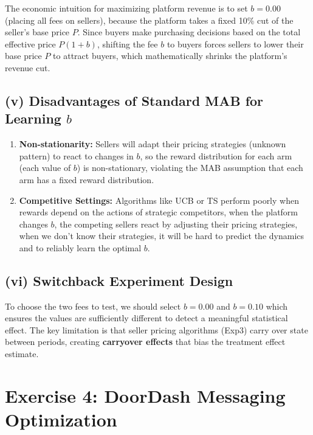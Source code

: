 \documentclass[12pt]{article}
\begin{document}
The economic intuition for maximizing platform revenue is to set $b=0.00$ (placing all fees on sellers), because the platform takes a fixed 10\% cut of the seller's base price $P$. Since buyers make purchasing decisions based on the total effective price $P(1+b)$, shifting the fee $b$ to buyers forces sellers to lower their base price $P$ to attract buyers, which mathematically shrinks the platform's revenue cut.

\subsection*{(v) Disadvantages of Standard MAB for Learning $b$}

\begin{enumerate}
    \item \textbf{Non-stationarity:} Sellers will adapt their pricing strategies (unknown pattern) to react to changes in $b$, so the reward distribution for each arm (each value of $b$) is non-stationary, violating the MAB assumption that each arm has a fixed reward distribution.
    \item \textbf{Competitive Settings:} Algorithms like UCB or TS perform poorly when rewards depend on the actions of strategic competitors, when the platform changes $b$, the competing sellers react by adjusting their pricing strategies, when we don't know their strategies, it will be hard to predict the dynamics and to reliably learn the optimal $b$.
\end{enumerate}

\subsection*{(vi) Switchback Experiment Design}

To choose the two fees to test, we should select $b=0.00$ and $b=0.10$ which ensures the values are sufficiently different to detect a meaningful statistical effect. The key limitation is that seller pricing algorithms (Exp3) carry over state between periods, creating \textbf{carryover effects} that bias the treatment effect estimate.

\newpage
\section*{Exercise 4: DoorDash Messaging Optimization}
\end{document}
